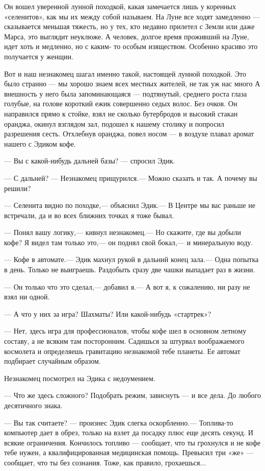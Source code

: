 \documentclass[11pt,a4paper,oneside]{article}
\begin{document}
Он вошел уверенной лунной походкой, какая замечается лишь у коренных «селенитов», как мы их между собой называем. На Луне все ходят замедленно — сказывается меньшая тяжесть, но у тех, кто недавно прилетел с Земли или даже Марса, это выглядит неуклюже. А человек, долгое время проживший на Луне, идет хоть и медленно, но с каким- то особым изяществом. Особенно красиво это получается у женщин.

Вот и наш незнакомец шагал именно такой, настоящей лунной походкой. Это было странно — мы хорошо знаем всех местных жителей, не так уж нас много А внешность у него была запоминающаяся — подтянутый, среднего роста глаза голубые, на голове короткий ежик совершенно седых волос. Без очков. Он направился прямо к стойке, взял не сколько бутербродов и высокий стакан оранджа, окинул взглядом зал, подошел к нашему столику и попросил разрешения сесть. Отхлебнув оранджа, повел носом — в воздухе плавал аромат нашего с Эдиком кофе.

— Вы с какой-нибудь дальней базы? — спросил Эдик.

— С дальней? — Незнакомец прищурился.— Можно сказать и так. А почему вы решили?

— Селенита видно по походке,— объяснил Эдик.— В Центре мы вас раньше не встречали, да и во всех ближних точках я тоже бывал.

— Понял вашу логику,— кивнул незнакомец.— Но скажите, где вы добыли кофе? Я видел там только это,— он поднял свой бокал,— и минеральную воду.

— Кофе в автомате.— Эдик махнул рукой в дальний конец зала.— Одна попытка в день. Только не выиграешь. Раздобыть сразу две чашки выпадает раз в жизни.

— Он только что это сделал,— добавил я.— А вот я, к сожалению, ни разу не взял ни одной.

— А что у них за игра? Шахматы? Или какой-нибудь «стартрек»?

— Нет, здесь игра для профессионалов, чтобы кофе шел в основном летному составу, а не всяким там посторонним. Садишься за штурвал воображаемого космолета и определяешь гравитацию незнакомой тебе планеты. Ее автомат подбирает случайным образом.

Незнакомец посмотрел на Эдика с недоумением.

— Что же здесь сложного? Подобрать режим, зависнуть — и все дела. До любого десятичного знака.

— Вы так считаете? — произнес Эдик слегка оскорбленно.— Топлива-то компьютер дает в обрез, только на взлет да посадку плюс еще десять секунд. И всякие ограничения. Кончилось топливо — сообщает, что ты грохнулся и не кофе тебе нужен, а квалифицированная медицинская помощь. Превысил три «же» — сообщает, что ты без сознания. Тоже, как правило, грохаешься...
\end{document}
